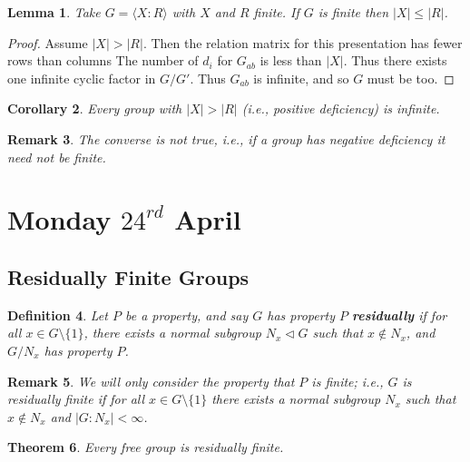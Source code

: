 \documentclass[a4paper,10pt]{article}
\newtheorem{thm}{Theorem}
\newtheorem{Def}[thm]{Definition}
\newtheorem{Cor}[thm]{Corollary}
\newtheorem{Lem}[thm]{Lemma}
\newtheorem{rem}[thm]{Remark}
\begin{document}
\begin{Lem}
Take $G = \langle X : R \rangle$ with $X$ and $R$ finite. If $G$ is finite then $|X| \leq |R|$. 
\end{Lem}

\begin{proof}
Assume $|X| > |R|$. Then the relation matrix for this presentation has fewer rows than columns The number of $d_i$ for $G_{ab}$ is less than $|X|$. Thus there exists one infinite cyclic factor in $G / G'$. Thus $G_{ab}$ is infinite, and so $G$ must be too. 
\end{proof}

\begin{Cor}
Every group with $|X| > |R|$ (i.e., positive deficiency) is infinite.
\end{Cor}

\begin{rem}
The converse is not true, i.e., if a group has negative deficiency it need not be finite.
\end{rem}




\newpage
\section{Monday $24^{rd}$ April}


\subsection{Residually Finite Groups}

\begin{Def}
Let $P$ be a property, and say $G$ has property $P$ \textbf{residually} if for all $x \in G \setminus \{1\}$, there exists a normal subgroup $N_x \triangleleft G$ such that $x \notin N_x$, and $G / N_x$ has property $P$. 
\end{Def}
\begin{rem}
We will only consider the property that $P$ is finite; i.e., $G$ is residually finite if for all $x \in G \setminus \{1\}$ there exists a normal subgroup $N_x$ such that $x \notin N_x$ and $|G : N_x| < \infty$. 
\end{rem}

\begin{thm}
Every free group is residually finite.
\end{thm}
\end{document}
